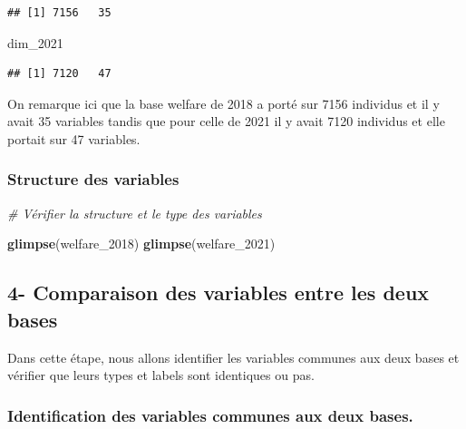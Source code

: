 \documentclass[
]{article}
\newenvironment{Shaded}{\begin{snugshade}}{\end{snugshade}}
\newcommand{\CommentTok}[1]{\textcolor[rgb]{0.56,0.35,0.01}{\textit{#1}}}
\newcommand{\FunctionTok}[1]{\textcolor[rgb]{0.13,0.29,0.53}{\textbf{#1}}}
\newcommand{\NormalTok}[1]{#1}
\begin{document}
\begin{verbatim}
## [1] 7156   35
\end{verbatim}

\begin{Shaded}
\begin{Highlighting}[]
\NormalTok{dim\_2021}
\end{Highlighting}
\end{Shaded}

\begin{verbatim}
## [1] 7120   47
\end{verbatim}

On remarque ici que la base welfare de 2018 a porté sur 7156 individus
et il y avait 35 variables tandis que pour celle de 2021 il y avait 7120
individus et elle portait sur 47 variables.

\hypertarget{structure-des-variables}{%
\subsubsection{Structure des variables}\label{structure-des-variables}}

\begin{Shaded}
\begin{Highlighting}[]
\CommentTok{\# Vérifier la structure et le type des variables}

\FunctionTok{glimpse}\NormalTok{(welfare\_2018)}
\FunctionTok{glimpse}\NormalTok{(welfare\_2021)}
\end{Highlighting}
\end{Shaded}

\hypertarget{comparaison-des-variables-entre-les-deux-bases}{%
\subsection{4- Comparaison des variables entre les deux
bases}\label{comparaison-des-variables-entre-les-deux-bases}}

Dans cette étape, nous allons identifier les variables communes aux deux
bases et vérifier que leurs types et labels sont identiques ou pas.

\hypertarget{identification-des-variables-communes-aux-deux-bases.}{%
\subsubsection{Identification des variables communes aux deux
bases.}\label{identification-des-variables-communes-aux-deux-bases.}}
\end{document}
